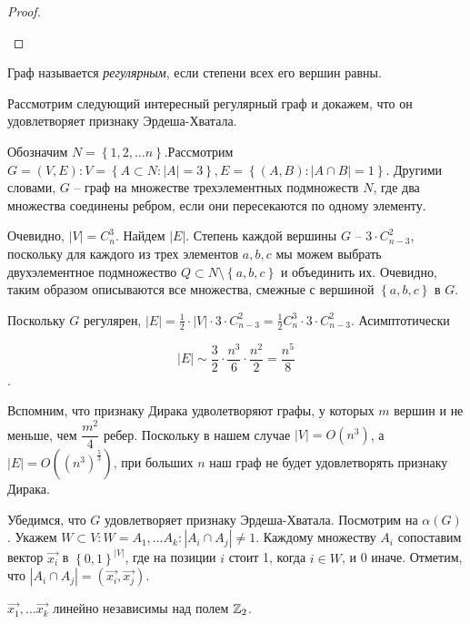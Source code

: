 \begin{proof}
\begin{enumerate}
	\end{enumerate}
\end{proof}

\begin{Def}
	Граф называется \emph{регулярным}, если степени всех его вершин равны.
\end{Def}

Рассмотрим следующий интересный регулярный граф и докажем, что он удовлетворяет признаку Эрдеша-Хватала.

Обозначим $ N = \left\lbrace 1, 2, \ldots n\right\rbrace $.Рассмотрим $ G = (V, E) : V = \left\lbrace A \subset N  : |A| = 3 \right\rbrace, E = \left\lbrace (A, B) : |A\cap B| = 1\right\rbrace  $. Другими словами, $ G $ -- граф на множестве трехэлементных подмножеств $ N $, где два множества соединены ребром, если они пересекаются по одному элементу.

Очевидно, $ |V| = C_n^3 $. Найдем $|E|$. Степень каждой вершины $  G $ -- $3 \cdot C_{n - 3}^2$, поскольку для каждого из трех элементов $ {a, b, c} $ мы можем выбрать двухэлементное подмножество $ Q \subset N \setminus \left\lbrace a, b, c \right\rbrace $ и объединить их. Очевидно, таким образом описываются все множества, смежные с вершиной  $ \left\lbrace a, b, c\right\rbrace $ в $ G $.

Поскольку $  G $ регулярен,  $ |E| = \frac{1}{2} \cdot |V| \cdot 3 \cdot  C_{n - 3}^2  = \frac{1}{2} C_n^3 \cdot 3 \cdot  C_{n - 3}^2 $. Асимптотически

$$ |E| \sim \dfrac{3}{2} \cdot \dfrac{n^3}{6} \cdot \dfrac{n^2}{2} =\dfrac{n^5}{8} $$.

Вспомним, что признаку Дирака удволетворяют графы, у которых $ m $ вершин и не меньше, чем $ \dfrac{m^2}{4} $ ребер.
Поскольку в нашем случае $|V| = O(n^3)$, а $|E| = O((n^3)^{\frac{5}{3}}) $, при больших $ n $ наш граф не будет удовлетворять признаку Дирака.

Убедимся, что $ G $ удовлетворяет признаку Эрдеша-Хватала. 
Посмотрим на $ \alpha(G) $. Укажем $ W \subset V : W = {A_1, \ldots A_k} : |A_i \cap A_j| \neq 1 $.
Каждому множеству $ A_i $ сопоставим вектор $ \overrightarrow{x_i} $ в $ \left\lbrace 0, 1\right\rbrace ^{|V|} $, где на позиции $ i $ стоит 1, когда $ i \in W $, и 0 иначе.
Отметим, что $ |A_i \cap A_j| = (\overrightarrow{x_i}, \overrightarrow{x_j}) $.

\begin{lemma}
	$ \overrightarrow{x_1}, \ldots \overrightarrow{x_k} $ линейно независимы над полем $ \mathbb{Z}_2 $.
\end{lemma}  

